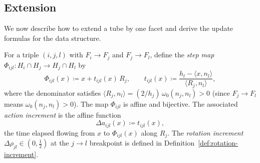 \subsection{Extension}\label{subsec:tube-extension}

We now describe how to extend a tube by one facet
and derive the update formulas for the data structure.

\begin{definition}\label{def:step-data}
For a triple $(i,j,l)$ with $F_i \to F_j$ and $F_j \to F_l$,
define the \emph{step map}
$\Phi_{ijl} \colon H_i \cap H_j \to H_j \cap H_l$ by
\begin{equation}\label{eq:step-map}
  \Phi_{ijl}(x) \coloneqq x + t_{ijl}(x)\, R_j,
  \qquad
  t_{ijl}(x) \coloneqq \frac{h_l - \langle x, n_l \rangle}{\langle R_j, n_l \rangle},
\end{equation}
where the denominator satisfies
$\langle R_j, n_l \rangle = (2/h_j)\,\omega_0(n_j, n_l) > 0$
(since $F_j \to F_l$ means $\omega_0(n_j, n_l) > 0$).
The map $\Phi_{ijl}$ is affine and bijective.
The associated \emph{action increment} is the affine function
\begin{equation}\label{eq:action-increment}
  \Delta a_{ijl}(x) \coloneqq t_{ijl}(x),
\end{equation}
the time elapsed flowing from $x$ to $\Phi_{ijl}(x)$ along $R_j$.
The \emph{rotation increment} $\Delta\rho_{jl} \in (0, \tfrac{1}{2})$
at the $j \to l$ breakpoint is defined in Definition~\ref{def:rotation-increment}.
\end{definition}

